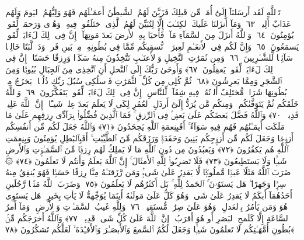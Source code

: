  تَٱللَّهِ لَقَد أَرسَلنَآ إِلَىٰٓ أُمَمٍۢ مِّن قَبلِكَ فَزَيَّنَ لَهُمُ ٱلشَّيطَٰنُ أَعمَـٰلَهُم فَهُوَ وَلِيُّهُمُ ٱليَومَ وَلَهُم عَذَابٌ أَلِيمٌۭ ﴿٦٣﴾
 وَمَآ أَنزَلنَا عَلَيكَ ٱلكِتَـٰبَ إِلَّا لِتُبَيِّنَ لَهُمُ ٱلَّذِى ٱختَلَفُوا۟ فِيهِ ۙ وَهُدًۭى وَرَحمَةًۭ لِّقَومٍۢ يُؤمِنُونَ ﴿٦٤﴾
 وَٱللَّهُ أَنزَلَ مِنَ ٱلسَّمَآءِ مَآءًۭ فَأَحيَا بِهِ ٱلأَرضَ بَعدَ مَوتِهَآ ۚ إِنَّ فِى ذَٟلِكَ لَءَايَةًۭ لِّقَومٍۢ يَسمَعُونَ ﴿٦٥﴾
 وَإِنَّ لَكُم فِى ٱلأَنعَـٰمِ لَعِبرَةًۭ ۖ نُّسقِيكُم مِّمَّا فِى بُطُونِهِۦ مِنۢ بَينِ فَرثٍۢ وَدَمٍۢ لَّبَنًا خَالِصًۭا سَآئِغًۭا لِّلشَّـٰرِبِينَ ﴿٦٦﴾
 وَمِن ثَمَرَٰتِ ٱلنَّخِيلِ وَٱلأَعنَـٰبِ تَتَّخِذُونَ مِنهُ سَكَرًۭا وَرِزقًا حَسَنًا ۗ إِنَّ فِى ذَٟلِكَ لَءَايَةًۭ لِّقَومٍۢ يَعقِلُونَ ﴿٦٧﴾
 وَأَوحَىٰ رَبُّكَ إِلَى ٱلنَّحلِ أَنِ ٱتَّخِذِى مِنَ ٱلجِبَالِ بُيُوتًۭا وَمِنَ ٱلشَّجَرِ وَمِمَّا يَعرِشُونَ ﴿٦٨﴾
 ثُمَّ كُلِى مِن كُلِّ ٱلثَّمَرَٰتِ فَٱسلُكِى سُبُلَ رَبِّكِ ذُلُلًۭا ۚ يَخرُجُ مِنۢ بُطُونِهَا شَرَابٌۭ مُّختَلِفٌ أَلوَٟنُهُۥ فِيهِ شِفَآءٌۭ لِّلنَّاسِ ۗ إِنَّ فِى ذَٟلِكَ لَءَايَةًۭ لِّقَومٍۢ يَتَفَكَّرُونَ ﴿٦٩﴾
 وَٱللَّهُ خَلَقَكُم ثُمَّ يَتَوَفَّىٰكُم ۚ وَمِنكُم مَّن يُرَدُّ إِلَىٰٓ أَرذَلِ ٱلعُمُرِ لِكَى لَا يَعلَمَ بَعدَ عِلمٍۢ شَيـًٔا ۚ إِنَّ ٱللَّهَ عَلِيمٌۭ قَدِيرٌۭ ﴿٧٠﴾
 وَٱللَّهُ فَضَّلَ بَعضَكُم عَلَىٰ بَعضٍۢ فِى ٱلرِّزقِ ۚ فَمَا ٱلَّذِينَ فُضِّلُوا۟ بِرَآدِّى رِزقِهِم عَلَىٰ مَا مَلَكَت أَيمَـٰنُهُم فَهُم فِيهِ سَوَآءٌ ۚ أَفَبِنِعمَةِ ٱللَّهِ يَجحَدُونَ ﴿٧١﴾
 وَٱللَّهُ جَعَلَ لَكُم مِّن أَنفُسِكُم أَزوَٟجًۭا وَجَعَلَ لَكُم مِّن أَزوَٟجِكُم بَنِينَ وَحَفَدَةًۭ وَرَزَقَكُم مِّنَ ٱلطَّيِّبَٰتِ ۚ أَفَبِٱلبَٰطِلِ يُؤمِنُونَ وَبِنِعمَتِ ٱللَّهِ هُم يَكفُرُونَ ﴿٧٢﴾
 وَيَعبُدُونَ مِن دُونِ ٱللَّهِ مَا لَا يَملِكُ لَهُم رِزقًۭا مِّنَ ٱلسَّمَـٰوَٟتِ وَٱلأَرضِ شَيـًۭٔا وَلَا يَستَطِيعُونَ ﴿٧٣﴾
 فَلَا تَضرِبُوا۟ لِلَّهِ ٱلأَمثَالَ ۚ إِنَّ ٱللَّهَ يَعلَمُ وَأَنتُم لَا تَعلَمُونَ ﴿٧٤﴾
 ۞ ضَرَبَ ٱللَّهُ مَثَلًا عَبدًۭا مَّملُوكًۭا لَّا يَقدِرُ عَلَىٰ شَىءٍۢ وَمَن رَّزَقنَـٰهُ مِنَّا رِزقًا حَسَنًۭا فَهُوَ يُنفِقُ مِنهُ سِرًّۭا وَجَهرًا ۖ هَل يَستَوُۥنَ ۚ ٱلحَمدُ لِلَّهِ ۚ بَل أَكثَرُهُم لَا يَعلَمُونَ ﴿٧٥﴾
 وَضَرَبَ ٱللَّهُ مَثَلًۭا رَّجُلَينِ أَحَدُهُمَآ أَبكَمُ لَا يَقدِرُ عَلَىٰ شَىءٍۢ وَهُوَ كَلٌّ عَلَىٰ مَولَىٰهُ أَينَمَا يُوَجِّههُّ لَا يَأتِ بِخَيرٍ ۖ هَل يَستَوِى هُوَ وَمَن يَأمُرُ بِٱلعَدلِ ۙ وَهُوَ عَلَىٰ صِرَٰطٍۢ مُّستَقِيمٍۢ ﴿٧٦﴾
 وَلِلَّهِ غَيبُ ٱلسَّمَـٰوَٟتِ وَٱلأَرضِ ۚ وَمَآ أَمرُ ٱلسَّاعَةِ إِلَّا كَلَمحِ ٱلبَصَرِ أَو هُوَ أَقرَبُ ۚ إِنَّ ٱللَّهَ عَلَىٰ كُلِّ شَىءٍۢ قَدِيرٌۭ ﴿٧٧﴾
 وَٱللَّهُ أَخرَجَكُم مِّنۢ بُطُونِ أُمَّهَـٰتِكُم لَا تَعلَمُونَ شَيـًۭٔا وَجَعَلَ لَكُمُ ٱلسَّمعَ وَٱلأَبصَـٰرَ وَٱلأَفـِٔدَةَ ۙ لَعَلَّكُم تَشكُرُونَ ﴿٧٨﴾

